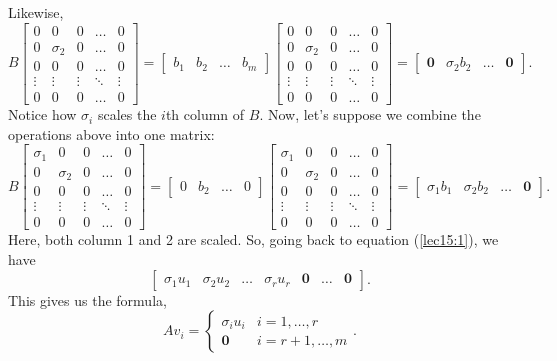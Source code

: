 \documentclass[letterpaper]{article}
\newcommand{\0}{\mathbf{0}}
\begin{document}
Likewise, \[B \begin{bmatrix}
    0 & 0 & 0 & \hdots & 0 \\ 
    0 & \sigma_2 & 0 & \hdots & 0 \\ 
    0 & 0 & 0 & \hdots & 0 \\ 
    \vdots & \vdots & \vdots & \ddots & \vdots \\
    0 & 0 & 0 & \hdots & 0
\end{bmatrix} = \begin{bmatrix}
    b_1 & b_2 & \hdots & b_m
\end{bmatrix}\begin{bmatrix}
    0 & 0 & 0 & \hdots & 0 \\ 
    0 & \sigma_2 & 0 & \hdots & 0 \\ 
    0 & 0 & 0 & \hdots & 0 \\ 
    \vdots & \vdots & \vdots & \ddots & \vdots \\
    0 & 0 & 0 & \hdots & 0
\end{bmatrix} = \begin{bmatrix}
    \0 & \sigma_2 b_2 & \hdots & \0
\end{bmatrix}.\] 
Notice how $\sigma_i$ scales the $i$th column of $B$. Now, let's suppose we combine the operations above into one matrix: 
\[B \begin{bmatrix}
    \sigma_1 & 0 & 0 & \hdots & 0 \\ 
    0 & \sigma_2 & 0 & \hdots & 0 \\ 
    0 & 0 & 0 & \hdots & 0 \\ 
    \vdots & \vdots & \vdots & \ddots & \vdots \\
    0 & 0 & 0 & \hdots & 0
\end{bmatrix} = \begin{bmatrix}
    0 & b_2 & \hdots & 0
\end{bmatrix}\begin{bmatrix}
    \sigma_1 & 0 & 0 & \hdots & 0 \\ 
    0 & \sigma_2 & 0 & \hdots & 0 \\ 
    0 & 0 & 0 & \hdots & 0 \\ 
    \vdots & \vdots & \vdots & \ddots & \vdots \\
    0 & 0 & 0 & \hdots & 0
\end{bmatrix} = \begin{bmatrix}
    \sigma_1 b_1 & \sigma_2 b_2 & \hdots & \0
\end{bmatrix}.\] 
Here, both column 1 and 2 are scaled. So, going back to equation (\ref{lec15:1}), we have 
\[\begin{bmatrix}
    \sigma_1 u_1 & \sigma_2 u_2 & \hdots & \sigma_r u_r & \0 & \hdots & \0
\end{bmatrix}.\]
This gives us the formula,
\[Av_i = \begin{cases}
    \sigma_i u_i & i = 1, \hdots, r \\ 
    \0 & i = r + 1, \hdots, m
\end{cases}.\]
\end{document}
